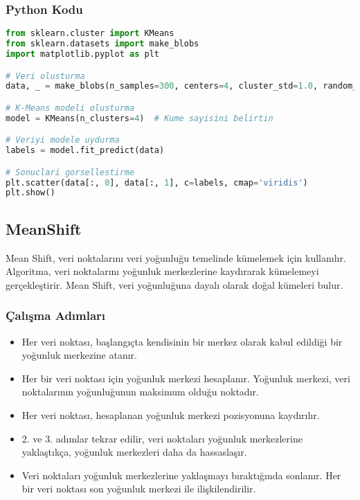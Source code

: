 \subsubsection{Python Kodu}

\begin{lstlisting}[language=Python, caption=Scikit-learn'de KMeans örneği.]
from sklearn.cluster import KMeans
from sklearn.datasets import make_blobs
import matplotlib.pyplot as plt

# Veri olusturma
data, _ = make_blobs(n_samples=300, centers=4, cluster_std=1.0, random_state=42)

# K-Means modeli olusturma
model = KMeans(n_clusters=4)  # Kume sayisini belirtin

# Veriyi modele uydurma
labels = model.fit_predict(data)

# Sonuclari gorsellestirme
plt.scatter(data[:, 0], data[:, 1], c=labels, cmap='viridis')
plt.show()
\end{lstlisting}

\newpage

\subsection{MeanShift}
Mean Shift, veri noktalarını veri yoğunluğu temelinde kümelemek için kullanılır. Algoritma, veri noktalarını yoğunluk merkezlerine kaydırarak kümelemeyi gerçekleştirir. Mean Shift, veri yoğunluğuna dayalı olarak doğal kümeleri bulur.

\subsubsection{Çalışma Adımları}
\begin{itemize}
    \item Her veri noktası, başlangıçta kendisinin bir merkez olarak kabul edildiği bir yoğunluk merkezine atanır.
    \item Her bir veri noktası için yoğunluk merkezi hesaplanır. Yoğunluk merkezi, veri noktalarının yoğunluğunun maksimum olduğu noktadır.
    \item Her veri noktası, hesaplanan yoğunluk merkezi pozisyonuna kaydırılır.
    \item 2. ve 3. adımlar tekrar edilir, veri noktaları yoğunluk merkezlerine yaklaştıkça, yoğunluk merkezleri daha da hassaslaşır.
    \item Veri noktaları yoğunluk merkezlerine yaklaşmayı bıraktığında sonlanır. Her bir veri noktası son yoğunluk merkezi ile ilişkilendirilir.
\end{itemize}

